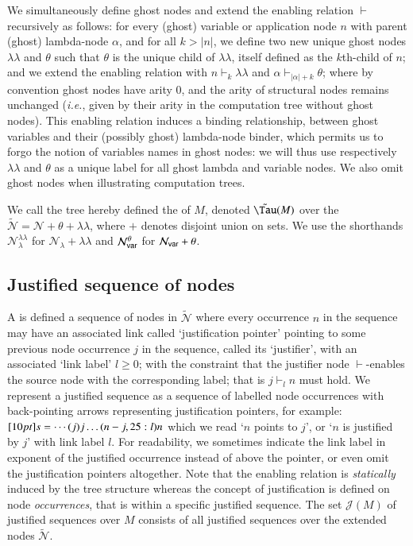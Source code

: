 \documentclass{elsarticle}
\makeatletter
\theoremstyle{plain}
\theoremstyle{definition}
\theoremstyle{remark}
\newcommand\Nodes{\mathcal{N}}%
\newcommand\NodesVar{\Nodes_{\sf var}}%
\newcommand\NodesLmd{\Nodes_\lambda}%
\newcommand{\ghostlmd}{{\lambda\!\!\lambda}}
\newcommand{\ghostvar}{\theta}
\newcommand\ExtendedNodes{\tilde{\Nodes}}
\newcommand\ExtendedNodesVar{\NodesVar^\ghostvar}
\newcommand\ExtendedNodesLmd{\NodesLmd^\ghostlmd}
\newcommand{\enables}{\vdash} %
\newcommand{\exttree}{\tilde{\Tau}} %
\renewcommand\ie{{\it i.e.\@\xspace}}
\def\justseqset{\mathcal{J}}
\makeatother
\begin{document}
We simultaneously define ghost nodes and extend the enabling relation $\enables$ recursively as follows: for every (ghost) variable or application node $n$ with parent (ghost) lambda-node $\alpha$, and for all $k>|n|$, we define two new unique ghost nodes $\ghostlmd$ and $\ghostvar$
such that
$\ghostvar$ is the unique child of $\ghostlmd$, itself defined as the $k$th-child of $n$;
and we extend the enabling relation with $n \enables_k \ghostlmd$
and $\alpha \enables_{|\alpha|+ k} \ghostvar$; where by convention ghost nodes have arity $0$, and the arity of structural nodes remains unchanged (\ie, given by their arity in the computation tree without ghost nodes).
This enabling relation induces a binding relationship, between ghost variables and their (possibly ghost) lambda-node binder, which permits us to forgo the notion of variables names in ghost nodes: we will thus
use respectively $\ghostlmd$ and $\ghostvar$ as a unique label for all ghost lambda and variable nodes. We also omit ghost nodes when illustrating computation trees.

We call the tree hereby defined the  of $M$,
denoted $\exttree(M)$ over the  $\ExtendedNodes = \Nodes + \ghostvar + \ghostlmd$, where $+$ denotes disjoint union on sets. We use the shorthands $\ExtendedNodesLmd$ for $\NodesLmd + \ghostlmd$ and $\ExtendedNodesVar$ for $\NodesVar + \ghostvar$.

\subsection{Justified sequence of nodes}
\label{sec:justseq}

A  is defined a sequence of nodes in $\ExtendedNodes$ where every occurrence $n$ in the sequence may have an associated link called `justification pointer' pointing to some previous node occurrence $j$ in the sequence, called its `justifier', with an associated `link label' $l\geq0$; with the constraint that the justifier node $\enables$-enables the source node with the corresponding label; that is $j \enables_l n$ must hold. We represent a justified sequence as a sequence of labelled node occurrences with back-pointing arrows representing justification pointers, for example: $\Pstr[10pt]{ s = \cdots (j){j} \ldots (n-j,25:l){n} }$ which we read `$n$ points to $j$', or `$n$ is justified by $j$' with link label $l$.
For readability, we sometimes indicate the link label in exponent of the justified occurrence instead of above the pointer, or even omit the justification pointers altogether.
Note that the enabling relation is \emph{statically} induced by the tree structure whereas the concept of justification is defined on node \emph{occurrences}, that is within a specific justified sequence. The set $\justseqset(M)$ of justified sequences over $M$ consists of all justified sequences over the extended nodes $\ExtendedNodes$.
\end{document}

